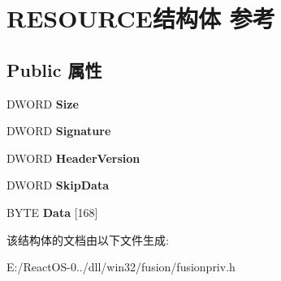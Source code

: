 \hypertarget{struct_r_e_s_o_u_r_c_e}{}\section{R\+E\+S\+O\+U\+R\+C\+E结构体 参考}
\label{struct_r_e_s_o_u_r_c_e}
\subsection*{Public 属性}
\begin{DoxyCompactItemize}
\item 
\mbox{\label{struct_r_e_s_o_u_r_c_e_a8ef124dd65ef5c276f51a425f096bd09}} 
D\+W\+O\+RD {\bfseries Size}
\item 
\mbox{\label{struct_r_e_s_o_u_r_c_e_a18bc0ae135a4dbe134440a1c8f26097e}} 
D\+W\+O\+RD {\bfseries Signature}
\item 
\mbox{\label{struct_r_e_s_o_u_r_c_e_aadcc851d6bdfee124881fc7227ca7771}} 
D\+W\+O\+RD {\bfseries Header\+Version}
\item 
\mbox{\label{struct_r_e_s_o_u_r_c_e_acb49dba316ea8cadba67e40d11920083}} 
D\+W\+O\+RD {\bfseries Skip\+Data}
\item 
\mbox{\label{struct_r_e_s_o_u_r_c_e_a3dabe33ee0f40edff11527286de950ef}} 
B\+Y\+TE {\bfseries Data} \mbox{[}168\mbox{]}
\end{DoxyCompactItemize}


该结构体的文档由以下文件生成\+:\begin{DoxyCompactItemize}
\item 
E\+:/\+React\+O\+S-\/0../dll/win32/fusion/fusionpriv.\+h\end{DoxyCompactItemize}
